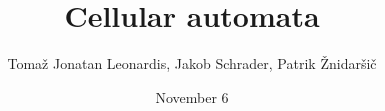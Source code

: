 \documentclass{beamer}
\title{Cellular automata}
\author{Tomaž Jonatan Leonardis, Jakob Schrader, Patrik Žnidaršič}
\date{November 6}
\begin{document}
\begin{frame}
  \maketitle
\end{frame}






\end{document}
